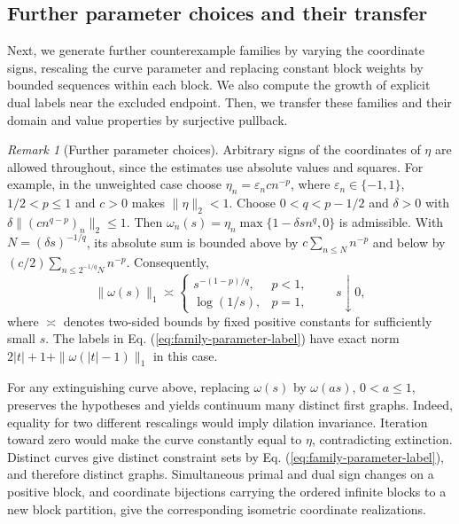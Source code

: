 \documentclass[11pt]{article}
\theoremstyle{definition}
\theoremstyle{remark}
\newtheorem{remark}{Remark}
\begin{document}
\subsection{Further parameter choices and their transfer}
\label{subsec:appendix-parameter-transfer}

Next, we generate further counterexample families by varying the coordinate signs, rescaling the curve parameter and replacing constant block weights by bounded sequences within each block. We also compute the growth of explicit dual labels near the excluded endpoint. Then, we transfer these families and their domain and value properties by surjective pullback.

\begin{remark}[Further parameter choices]
Arbitrary signs of the coordinates of $\eta$ are allowed throughout, since the estimates use absolute values and squares. For example, in the unweighted case choose $\eta_n=\varepsilon_nc n^{-p}$, where $\varepsilon_n\in\{-1,1\}$, $1/2<p\le1$ and $c>0$ makes $\|\eta\|_2<1$. Choose $0<q<p-1/2$ and $\delta>0$ with $\delta\|(c n^{q-p})_n\|_2\le1$. Then $\omega_n(s)=\eta_n\max\{1-\delta s n^q,0\}$ is admissible. With $N=(\delta s)^{-1/q}$, its absolute sum is bounded above by $c\sum_{n\le N}n^{-p}$ and below by $(c/2)\sum_{n\le2^{-1/q}N}n^{-p}$. Consequently,
\[
\|\omega(s)\|_1\asymp
\begin{cases}
s^{-(1-p)/q},&p<1,\\
\log(1/s),&p=1,
\end{cases}
\qquad s\downarrow0,
\]
where $\asymp$ denotes two-sided bounds by fixed positive constants for sufficiently small $s$. The labels in Eq. (\ref{eq:family-parameter-label}) have exact norm $2|t|+1+\|\omega(|t|-1)\|_1$ in this case.

For any extinguishing curve above, replacing $\omega(s)$ by $\omega(as)$, $0<a\le1$, preserves the hypotheses and yields continuum many distinct first graphs. Indeed, equality for two different rescalings would imply dilation invariance. Iteration toward zero would make the curve constantly equal to $\eta$, contradicting extinction. Distinct curves give distinct constraint sets by Eq. (\ref{eq:family-parameter-label}), and therefore distinct graphs. Simultaneous primal and dual sign changes on a positive block, and coordinate bijections carrying the ordered infinite blocks to a new block partition, give the corresponding isometric coordinate realizations.


\end{remark}
\end{document}
